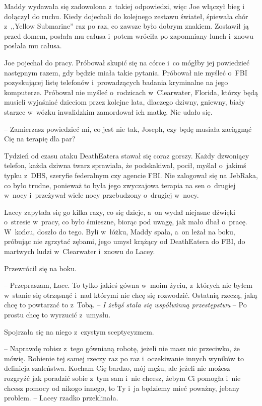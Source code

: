 \documentclass[oneside,polish,11pt,sfheadings]{mwbk}
\begin{document}
Maddy wydawała się zadowolona z~takiej odpowiedzi, więc Joe włączył bieg
i dołączył do ruchu. Kiedy dojechali do kolejnego zestawu świateł,
śpiewała chór z~,,Yellow Submarine'' raz po raz, co zawsze było dobrym
znakiem. Zostawił ją przed domem, posłała mu całusa i~potem wróciła po
zapomniany lunch i~znowu posłała mu całusa.

Joe pojechał do pracy. Próbował skupić się na córce i~co mógłby jej
powiedzieć następnym razem, gdy będzie miała takie pytania. Próbował nie
myśleć o~FBI pozyskującej listę telefonów i~prowadzących badania
kryminalne na jego komputerze. Próbował nie myśleć o~rodzicach w~Clearwater, Florida, którzy będą musieli wyjaśniać dzieciom przez
kolejne lata, dlaczego dziwny, gniewny, biały starzec w~wózku
inwalidzkim zamordował ich matkę. Nie udało się.

-- Zamierzasz powiedzieć mi, co jest nie tak, Joseph, czy będę musiała
zaciągnąć Cię na terapię dla par?

Tydzień od czasu ataku DeathEatera stawał się coraz gorszy. Każdy
dzwoniący telefon, każda dziwna twarz sprawiała, że podskakiwał, pocił,
myślał o~jakimś typku z~DHS, szeryfie federalnym czy agencie FBI. Nie
zalogował się na JebRaka, co było trudne, ponieważ to była jego
zwyczajowa terapia na sen o~drugiej w~nocy i~przeżywał wiele nocy
przebudzony o~drugiej w~nocy.

Lacey zapytała się go kilka razy, co się dzieje, a~on wydał niejasne
dźwięki o~stresie w~pracy, co było śmieszne, biorąc pod uwagę, jak mało
dbał o~pracę. W~końcu, doszło do tego. Byli w~łóżku, Maddy spała, a~on
leżał na boku, próbując nie zgrzytać zębami, jego umysł krążący od
DeathEatera do FBI, do martwych ludzi w~Clearwater i~znowu do Lacey.

Przewrócił się na boku. 

-- Przepraszam, Lace. To tylko jakieś gówna w~moim życiu, z~których nie byłem w~stanie się otrząsnąć i~nad którymi nie
chcę się rozwodzić. Ostatnią rzeczą, jaką chcę to powtarzać to z~Tobą. -- \textit{I żebyś stała się współwinną przestępstwu} -- Po prostu chcę to
wyrzucić z~umysłu.

Spojrzała się na niego z~czystym sceptycyzmem. 

-- Naprawdę robisz z~tego
gównianą robotę, jeżeli nie masz nic przeciwko, że mówię. Robienie tej
samej rzeczy raz po raz i~oczekiwanie innych wyników to definicja
szaleństwa. Kocham Cię bardzo, mój mężu, ale jeżeli nie możesz rozgryźć
jak poradzić sobie z~tym sam i~nie chcesz, żebym Ci pomogła i~nie chcesz
pomocy od nikogo innego, to Ty i~ja będziemy mieć poważny, jebany
problem. -- Lacey rzadko przeklinała.
\end{document}
